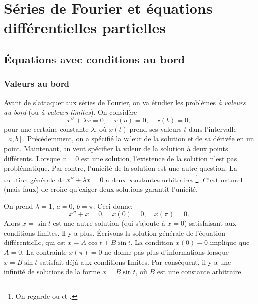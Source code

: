 \chapter{Séries de Fourier et équations différentielles partielles} \label{FS:chapter}


\section{Équations avec conditions au bord} \label{bvp:section}


\subsection{Valeurs au bord}

Avant de s'attaquer aux séries de Fourier, on va étudier les problèmes \emph{à valeurs au bord}
 (ou \emph{à valeurs limites}).  On considère
\begin{equation*}
x'' + \lambda x = 0, \quad x(a) = 0, \quad x(b) = 0,
\end{equation*}
pour une certaine constante $\lambda$, où $x(t)$ prend ses valeurs  $t$ dans l'intervalle 
$[a,b]$.
Précédemment, on a spécifié la valeur de la solution et de sa dérivée en un point. Maintenant, on veut spécifier la valeur de la solution à deux points différents. Lorsque $x=0$ est une solution, l'existence de la solution n'est pas problématique. Par contre, l'unicité de la solution est une autre question. La solution générale de  $x'' + \lambda x = 0$ a deux constantes arbitraires \footnote{%
On regarde  ou  et
.}.
C'est naturel (mais faux) de croire qu'exiger deux solutions garantit l'unicité. 

\begin{example}
On prend $\lambda = 1$,
$a=0$, $b=\pi$.  Ceci donne: 
\begin{equation*}
x'' + x = 0, \quad x(0) = 0, \quad x(\pi) = 0.
\end{equation*}
Alors $x = \sin t$ est une autre solution  (qui s'ajoute à  $x=0$) satisfaisant aux conditions limites. 
Il y a plus. Écrivons la solution générale de l'équation différentielle, qui est  $x= A \cos t + B \sin t$.
La condition $x(0) = 0$ implique que $A=0$.  La contrainte $x(\pi) = 0$ ne donne pas plus d'informations lorsque $x = B \sin t$ satisfait déjà aux conditions limites. 
Par conséquent, il y a une infinité de solutions de la forme  $x = B \sin t$,
où $B$ est une constante arbitraire.  
\end{example}

